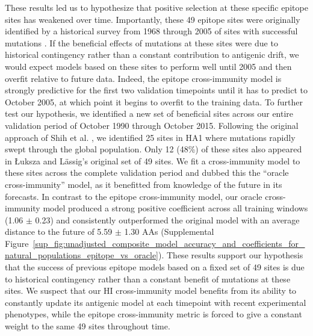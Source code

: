 These results led us to hypothesize that positive selection at these specific epitope sites has weakened over time.
Importantly, these 49 epitope sites were originally identified by a historical survey from 1968 through 2005 of sites with successful mutations \cite{Shih:2007bd}.
If the beneficial effects of mutations at these sites were due to historical contingency rather than a constant contribution to antigenic drift, we would expect models based on these sites to perform well until 2005 and then overfit relative to future data.
Indeed, the epitope cross-immunity model is strongly predictive for the first two validation timepoints until it has to predict to October 2005, at which point it begins to overfit to the training data.
To further test our hypothesis, we identified a new set of beneficial sites across our entire validation period of October 1990 through October 2015.
Following the original approach of Shih et al. \cite{Shih:2007bd}, we identified 25 sites in HA1 where mutations rapidly swept through the global population.
Only 12 (48\%) of these sites also appeared in {\L}uksza and L\"assig's \cite{Luksza:2014hj} original set of 49 sites.
We fit a cross-immunity model to these sites across the complete validation period and dubbed this the ``oracle cross-immunity'' model, as it benefitted from knowledge of the future in its forecasts.
In contrast to the epitope cross-immunity model, our oracle cross-immunity model produced a strong positive coefficient across all training windows (1.06 $\pm$ 0.23) and consistently outperformed the original model with an average distance to the future of 5.59 $\pm$ 1.30 AAs (Supplemental Figure~\ref{sup_fig:unadjusted_composite_model_accuracy_and_coefficients_for_natural_populations_epitope_vs_oracle}).
These results support our hypothesis that the success of previous epitope models based on a fixed set of 49 sites is due to historical contingency rather than a constant benefit of mutations at these sites.
We suspect that our HI cross-immunity model benefits from its ability to constantly update its antigenic model at each timepoint with recent experimental phenotypes, while the epitope cross-immunity metric is forced to give a constant weight to the same 49 sites throughout time.

